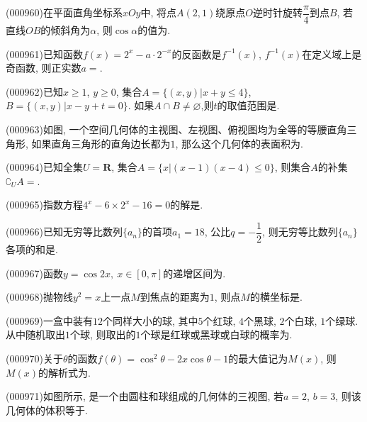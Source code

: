 \item (000960)在平面直角坐标系$xOy$中, 将点$A(2,1)$绕原点$O$逆时针旋转$\dfrac\pi 4$到点$B$, 若直线$OB$的倾斜角为$\alpha$, 则$\cos \alpha$的值为.
\item (000961)已知函数$f(x)=2^x-a\cdot 2^{-x}$的反函数是$f^{-1}(x)$, $f^{-1}(x)$在定义域上是奇函数, 则正实数$a=$.
\item (000962)已知$x\ge 1$, $y\ge 0$, 集合$A=\{(x,y)|x+y\le 4\}$, $B=\{(x,y)|x-y+t=0\}$. 如果$A\cap B\ne \varnothing$,则$t$的取值范围是.
\item (000963)如图, 一个空间几何体的主视图、左视图、俯视图均为全等的等腰直角三角形, 如果直角三角形的直角边长都为$1$, 那么这个几何体的表面积为.
\begin{center}
\end{center}
\item (000964)已知全集$U=\mathbf{R}$, 集合$A=\{x|(x-1)(x-4)\le 0\}$, 则集合$A$的补集$\complement_UA=$.
\item (000965)指数方程$4^x-6 \times 2^x-16=0$的解是.
\item (000966)已知无穷等比数列$\{a_n\}$的首项$a_1=18$, 公比$q=-\dfrac12$, 则无穷等比数列$\{a_n\}$各项的和是.
\item (000967)函数$y=\cos 2x, \ x\in [0,\pi]$的递增区间为.
\item (000968)抛物线$y^2=x$上一点$M$到焦点的距离为$1$, 则点$M$的横坐标是.
\item (000969)一盒中装有$12$个同样大小的球, 其中$5$个红球, $4$个黑球, $2$个白球, $1$个绿球. 从中随机取出$1$个球, 则取出的$1$个球是红球或黑球或白球的概率为.
\item (000970)关于$\theta$的函数$f(\theta)=\cos^2\theta-2x\cos\theta-1$的最大值记为$M(x)$, 则$M(x)$的解析式为.
\item (000971)如图所示, 是一个由圆柱和球组成的几何体的三视图, 若$a=2$, $b=3$, 则该几何体的体积等于.
